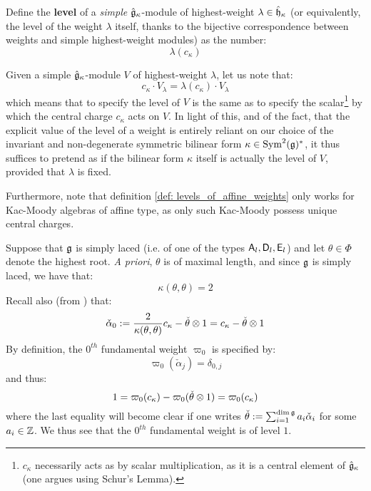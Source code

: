         \begin{definition} \label{def: levels_of_affine_weights}
            Define the \textbf{level} of a \textit{simple} $\hat{\mathfrak{g}}_{\kappa}$-module of highest-weight $\lambda \in \hat{\mathfrak{h}}_{\kappa}$ (or equivalently, the level of the weight $\lambda$ itself, thanks to the bijective correspondence between weights and simple highest-weight modules) as the number:
                $$\lambda(c_{\kappa})$$
        \end{definition}
        \begin{remark}
            Given a simple $\hat{\mathfrak{g}}_{\kappa}$-module $V$ of highest-weight $\lambda$, let us note that:
                $$c_{\kappa} \cdot V_{\lambda} = \lambda(c_{\kappa}) \cdot V_{\lambda}$$
            which means that to specify the level of $V$ is the same as to specify the scalar\footnote{$c_{\kappa}$ necessarily acts as by scalar multiplication, as it is a central element of $\hat{\mathfrak{g}}_{\kappa}$ (one argues using Schur's Lemma).} by which the central charge $c_{\kappa}$ acts on $V$. In light of this, and of the fact, that the explicit value of the level of a weight is entirely reliant on our choice of the invariant and non-degenerate symmetric bilinear form $\kappa \in \mathrm{Sym}^2(\mathfrak{g})^*$, it thus suffices to pretend as if the bilinear form $\kappa$ itself is actually the level of $V$, provided that $\lambda$ is fixed.

            Furthermore, note that definition \ref{def: levels_of_affine_weights} only works for Kac-Moody algebras of affine type, as only such Kac-Moody possess unique central charges.
        \end{remark}
        \begin{example}
            Suppose that $\mathfrak{g}$ is simply laced (i.e. of one of the types $\mathsf{A}_l, \mathsf{D}_l, \mathsf{E}_l$) and let $\theta \in \Phi$ denote the highest root. \textit{A priori}, $\theta$ is of maximal length, and since $\mathfrak{g}$ is simply laced, we have that:
                $$\kappa(\theta, \theta) = 2$$
            Recall also (from \cite[p. 100]{kac_infinite_dimensional_lie_algebras}) that:
                $$\check{\alpha}_0 := \frac{2}{\kappa(\theta, \theta)} c_{\kappa} - \check{\theta} \tensor 1 = c_{\kappa} - \check{\theta} \tensor 1$$
            By definition, the $0^{th}$ fundamental weight $\varpi_0$ is specified by:
                $$\varpi_0( \check{\alpha}_j) = \delta_{0, j}$$
            and thus:
                $$1 = \varpi_0(c_{\kappa}) - \varpi_0(\check{\theta} \tensor 1) = \varpi_0(c_{\kappa})$$
            where the last equality will become clear if one writes $\check{\theta} := \sum_{i = 1}^{\dim \mathfrak{g}} a_i \check{\alpha}_i$ for some $a_i \in \mathbb{Z}$. We thus see that the $0^{th}$ fundamental weight is of level $1$. 
        \end{example}

